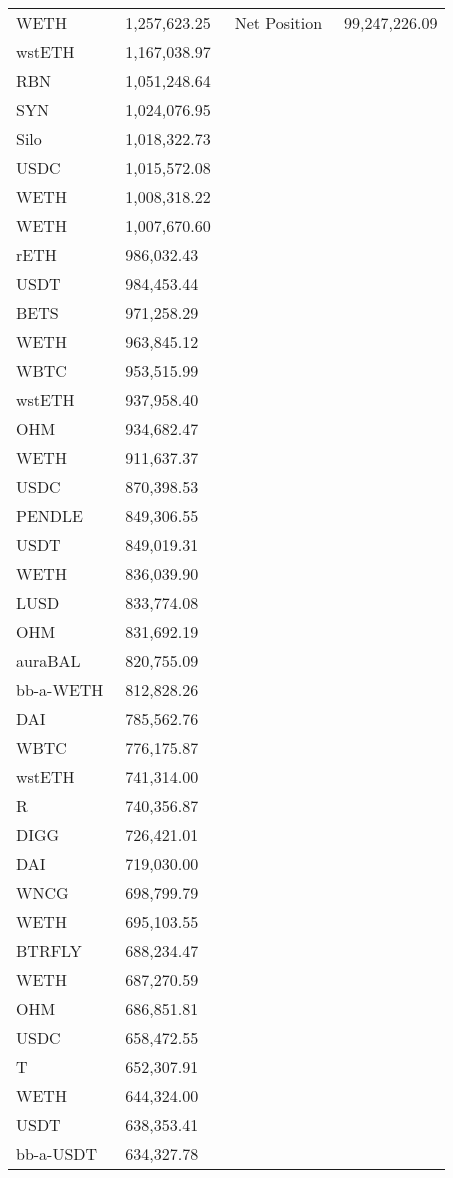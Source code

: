 \begin{longtable}{@{}p{0.25\linewidth}p{0.25\linewidth}p{0.25\linewidth}p{0.25\linewidth}@{}}
WETH & 1,257,623.25 & Net Position &99,247,226.09 \\
wstETH & 1,167,038.97 & & \\
RBN & 1,051,248.64 & & \\
SYN & 1,024,076.95 & & \\
Silo & 1,018,322.73 & & \\
USDC & 1,015,572.08 & & \\
WETH & 1,008,318.22 & & \\
WETH & 1,007,670.60 & & \\
rETH & 986,032.43 & & \\
USDT & 984,453.44 & & \\
BETS & 971,258.29 & & \\
WETH & 963,845.12 & & \\
WBTC & 953,515.99 & & \\
wstETH & 937,958.40 & & \\
OHM & 934,682.47 & & \\
WETH & 911,637.37 & & \\
USDC & 870,398.53 & & \\
PENDLE & 849,306.55 & & \\
USDT & 849,019.31 & & \\
WETH & 836,039.90 & & \\
LUSD & 833,774.08 & & \\
OHM & 831,692.19 & & \\
auraBAL & 820,755.09 & & \\
bb-a-WETH & 812,828.26 & & \\
DAI & 785,562.76 & & \\
WBTC & 776,175.87 & & \\
wstETH & 741,314.00 & & \\
R & 740,356.87 & & \\
DIGG & 726,421.01 & & \\
DAI & 719,030.00 & & \\
WNCG & 698,799.79 & & \\
WETH & 695,103.55 & & \\
BTRFLY & 688,234.47 & & \\
WETH & 687,270.59 & & \\
OHM & 686,851.81 & & \\
USDC & 658,472.55 & & \\
T & 652,307.91 & & \\
WETH & 644,324.00 & & \\
USDT & 638,353.41 & & \\
bb-a-USDT & 634,327.78 & & \\

\end{longtable}
